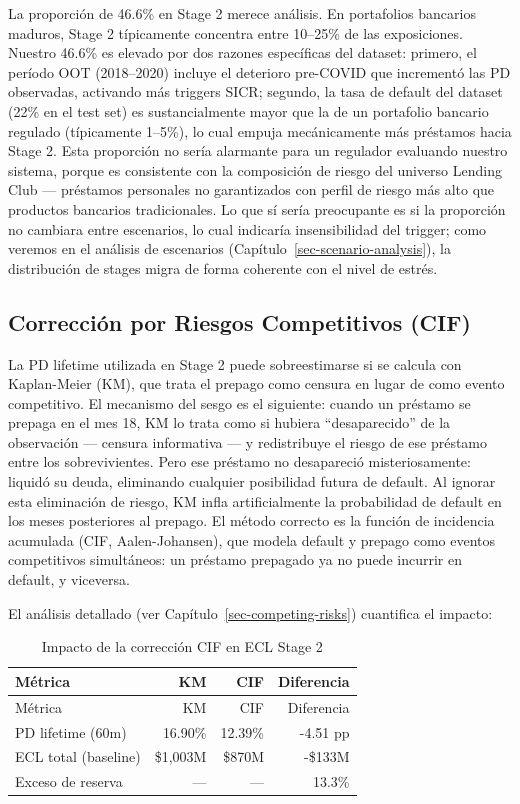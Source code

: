 \documentclass[
  spanish,
  11pt,
  letterpaper,
]{scrbook}
\theoremstyle{plain}
\theoremstyle{remark}
\begin{document}
La proporción de 46.6\% en Stage 2 merece análisis. En portafolios
bancarios maduros, Stage 2 típicamente concentra entre 10--25\% de las
exposiciones. Nuestro 46.6\% es elevado por dos razones específicas del
dataset: primero, el período OOT (2018--2020) incluye el deterioro
pre-COVID que incrementó las PD observadas, activando más triggers SICR;
segundo, la tasa de default del dataset (22\% en el test set) es
sustancialmente mayor que la de un portafolio bancario regulado
(típicamente 1--5\%), lo cual empuja mecánicamente más préstamos hacia
Stage 2. Esta proporción no sería alarmante para un regulador evaluando
nuestro sistema, porque es consistente con la composición de riesgo del
universo Lending Club --- préstamos personales no garantizados con
perfil de riesgo más alto que productos bancarios tradicionales. Lo que
sí sería preocupante es si la proporción no cambiara entre escenarios,
lo cual indicaría insensibilidad del trigger; como veremos en el
análisis de escenarios (Capítulo~\ref{sec-scenario-analysis}), la
distribución de stages migra de forma coherente con el nivel de estrés.

\subsection{Corrección por Riesgos Competitivos
(CIF)}\label{sec-cif-correction}

La PD lifetime utilizada en Stage 2 puede sobreestimarse si se calcula
con Kaplan-Meier (KM), que trata el prepago como censura en lugar de
como evento competitivo. El mecanismo del sesgo es el siguiente: cuando
un préstamo se prepaga en el mes 18, KM lo trata como si hubiera
``desaparecido'' de la observación --- censura informativa --- y
redistribuye el riesgo de ese préstamo entre los sobrevivientes. Pero
ese préstamo no desapareció misteriosamente: liquidó su deuda,
eliminando cualquier posibilidad futura de default. Al ignorar esta
eliminación de riesgo, KM infla artificialmente la probabilidad de
default en los meses posteriores al prepago. El método correcto es la
función de incidencia acumulada (CIF, Aalen-Johansen), que modela
default y prepago como eventos competitivos simultáneos: un préstamo
prepagado ya no puede incurrir en default, y viceversa.

El análisis detallado (ver Capítulo~\ref{sec-competing-risks})
cuantifica el impacto:

\begin{longtable}[]{@{}lrrr@{}}
\caption{Impacto de la corrección CIF en ECL Stage
2}\label{tbl-cif-impact}\tabularnewline
\toprule\noalign{}
Métrica & KM & CIF & Diferencia \\
\midrule\noalign{}
\endfirsthead
\toprule\noalign{}
Métrica & KM & CIF & Diferencia \\
\midrule\noalign{}
\endhead
\bottomrule\noalign{}
\endlastfoot
PD lifetime (60m) & 16.90\% & 12.39\% & -4.51 pp \\
ECL total (baseline) & \$1,003M & \$870M & -\$133M \\
Exceso de reserva & --- & --- & 13.3\% \\
\end{longtable}
\end{document}

